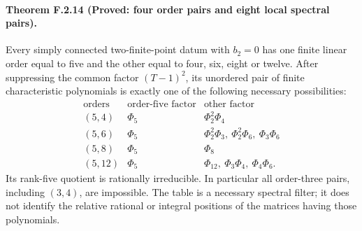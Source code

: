 \paragraph{Theorem F.2.14 (Proved: four order pairs and eight local spectral pairs).}
Every simply connected two-finite-point datum with $b_2=0$ has
one finite linear order equal to five and the other equal
to four, six, eight or twelve.
After suppressing the common factor $(T-1)^2$, its unordered
pair of finite characteristic polynomials is exactly one
of the following necessary possibilities:
\[
\begin{array}{c|c|l}
 \text{orders}&\text{order-five factor}&\text{other factor}\\\hline
 (5,4)&\Phi_5&\Phi_2^2\Phi_4\\
 (5,6)&\Phi_5&\Phi_2^2\Phi_3,\ \Phi_2^2\Phi_6,\ \Phi_3\Phi_6\\
 (5,8)&\Phi_5&\Phi_8\\
 (5,12)&\Phi_5&\Phi_{12},\ \Phi_3\Phi_4,\ \Phi_4\Phi_6.
\end{array}
 \tag{F.39}
\]
Its rank-five quotient is rationally irreducible.
In particular all order-three pairs, including $(3,4)$,
are impossible.  The table is a necessary spectral filter;
it does not identify the relative rational or integral
positions of the matrices having those polynomials.

